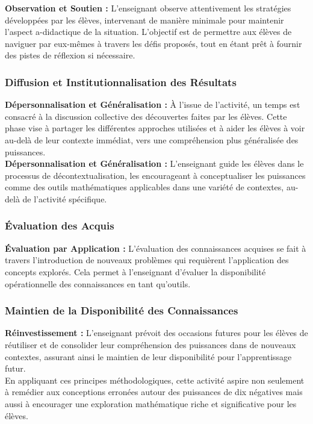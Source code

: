 \textbf{Observation et Soutien :}
L'enseignant observe attentivement les stratégies développées par les élèves,
intervenant de manière minimale pour maintenir l'aspect a-didactique de la situation.
L'objectif est de permettre aux élèves de naviguer par eux-mêmes à travers les défis proposés,
tout en étant prêt à fournir des pistes de réflexion si nécessaire.

\subsubsection{Diffusion et Institutionnalisation des Résultats}

\textbf{Dépersonnalisation et Généralisation :}
À l'issue de l'activité,
un temps est consacré à la discussion collective des découvertes faites par les élèves.
Cette phase vise à partager les différentes approches utilisées et à aider les élèves à voir au-delà de leur contexte immédiat,
vers une compréhension plus généralisée des puissances.\\

\textbf{Dépersonnalisation et Généralisation :}
L'enseignant guide les élèves dans le processus de décontextualisation,
les encourageant à conceptualiser les puissances comme des outils mathématiques applicables dans une variété de contextes,
au-delà de l'activité spécifique.

\subsubsection{Évaluation des Acquis}

\textbf{Évaluation par Application :}
L'évaluation des connaissances acquises se fait à travers l'introduction de nouveaux problèmes qui requièrent l'application des concepts explorés.
Cela permet à l'enseignant d'évaluer la disponibilité opérationnelle des connaissances en tant qu'outils.

\subsubsection{Maintien de la Disponibilité des Connaissances}

\textbf{Réinvestissement :}
L'enseignant prévoit des occasions futures pour les élèves de réutiliser et de consolider leur compréhension des puissances dans de nouveaux contextes,
assurant ainsi le maintien de leur disponibilité pour l'apprentissage futur.\\

En appliquant ces principes méthodologiques,
cette activité aspire non seulement à remédier aux conceptions erronées autour des puissances de dix négatives mais aussi à encourager une exploration mathématique riche et significative pour les élèves.

